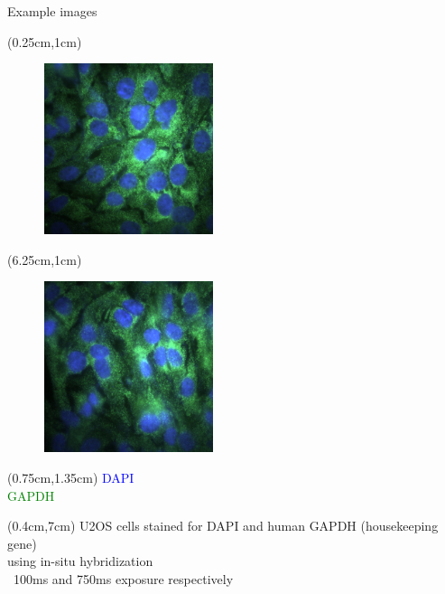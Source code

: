 \documentclass{beamer}					%
\begin{document}
\begin{frame}{Example images}

\begin{textblock*}{6cm}(0.25cm,1cm)
\begin{figure}
\includegraphics[width=5cm, height=5cm]{dapi-gapdh-1.png}
\end{figure}
\end{textblock*}

\begin{textblock*}{6cm}(6.25cm,1cm)
\begin{figure}
\includegraphics[width=5cm, height=5cm]{dapi-gapdh-2.png}
\end{figure}
\end{textblock*}

\begin{textblock*}{6cm}(0.75cm,1.35cm)
\textcolor{blue}{DAPI}\\
\textcolor{green}{GAPDH}
\end{textblock*}

\begin{textblock*}{15cm}(0.4cm,7cm)
U2OS cells stained for DAPI and human GAPDH (housekeeping gene)\\ using in-situ hybridization\\
\vspace{0.1in}
~100ms and 750ms exposure respectively
\end{textblock*}



\end{frame}
\end{document}
